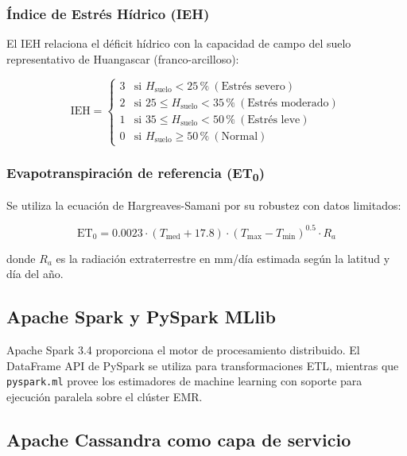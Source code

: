 \documentclass[12pt,a4paper]{article}
\begin{document}
\subsubsection{Índice de Estrés Hídrico (IEH)}
El IEH relaciona el déficit hídrico con la capacidad de campo del suelo
representativo de Huangascar (franco-arcilloso):

\begin{equation}
  \text{IEH} =
  \begin{cases}
    3 & \text{si } H_{\text{suelo}} < 25\,\%\ (\text{Estrés severo}) \\
    2 & \text{si } 25 \le H_{\text{suelo}} < 35\,\%\ (\text{Estrés moderado}) \\
    1 & \text{si } 35 \le H_{\text{suelo}} < 50\,\%\ (\text{Estrés leve}) \\
    0 & \text{si } H_{\text{suelo}} \ge 50\,\%\ (\text{Normal})
  \end{cases}
\end{equation}

\subsubsection{Evapotranspiración de referencia (ET\textsubscript{0})}
Se utiliza la ecuación de Hargreaves-Samani \cite{hargreaves1985} por su
robustez con datos limitados:

\begin{equation}
  \text{ET}_0 = 0.0023 \cdot (T_{\text{med}} + 17.8) \cdot
                (T_{\max} - T_{\min})^{0.5} \cdot R_a
\end{equation}

donde $R_a$ es la radiación extraterrestre en mm/día estimada según la
latitud y día del año.

\subsection{Apache Spark y PySpark MLlib}

Apache Spark 3.4 proporciona el motor de procesamiento distribuido. El
DataFrame API de PySpark se utiliza para transformaciones ETL, mientras
que \texttt{pyspark.ml} provee los estimadores de machine learning con
soporte para ejecución paralela sobre el clúster EMR.

\subsection{Apache Cassandra como capa de servicio}
\end{document}
